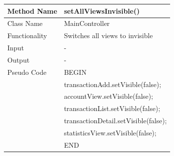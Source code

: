 \documentclass[12pt]{article}
\begin{document}
\begin{tabular}{ |p{3cm}||p{\colWidth}|  }
	\hline
	Method Name &  setAllViewsInvisible() \\
	\hline
	Class Name & MainController\\
	\hline
	Functionality & Switches all views to invisible\\
	\hline
	Input &-\\
	\hline
	Output & -\\
	\hline
	Pseudo Code & BEGIN\\
	&	transactionAdd.setVisible(false); \\
	&	accountView.setVisible(false);\\
	&	transactionList.setVisible(false);\\
	&	transactionDetail.setVisible(false);\\
	&	statisticsView.setVisible(false);\\
	& END\\
	\hline
\end{tabular}   
\end{document}
